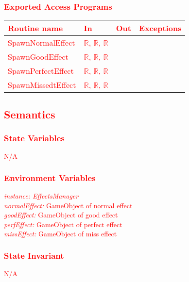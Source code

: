 \documentclass[12pt]{article}
\begin{document}
\subsubsection {\textcolor{red}{Exported Access Programs}}

\begin{tabular}{| l | l | l | l |}
\hline
\textcolor{red}{\textbf{Routine name}} & \textcolor{red}{\textbf{In}} & \textcolor{red}{\textbf{Out}} & \textcolor{red}{\textbf{Exceptions}}\\
\hline
\textcolor{red}{SpawnNormalEffect} & \textcolor{red}{$\mathbb{R}$, $\mathbb{R}$, $\mathbb{R}$} & &\\
\hline
\textcolor{red}{SpawnGoodEffect} & \textcolor{red}{$\mathbb{R}$, $\mathbb{R}$, $\mathbb{R}$} & &\\
\hline
\textcolor{red}{SpawnPerfectEffect} & \textcolor{red}{$\mathbb{R}$, $\mathbb{R}$, $\mathbb{R}$} & &\\
\hline
\textcolor{red}{SpawnMissedtEffect} & \textcolor{red}{$\mathbb{R}$, $\mathbb{R}$, $\mathbb{R}$}& &\\
\hline
\end{tabular}

\subsection {\textcolor{red}{Semantics}}

\subsubsection {\textcolor{red}{State Variables}}
\textcolor{red}{N/A}

\subsubsection {\textcolor{red}{Environment Variables}}
\textcolor{red}{\textit{instance: EffectsManager}}\\
\textcolor{red}{\textit{normalEffect:} GameObject of normal effect}\\
\textcolor{red}{\textit{goodEffect:} GameObject of good effect}\\
\textcolor{red}{\textit{perfEffect:} GameObject of perfect effect} \\
\textcolor{red}{\textit{missEffect:} GameObject of miss effect}

\subsubsection {\textcolor{red}{State Invariant}}
\textcolor{red}{N/A}
\end{document}
